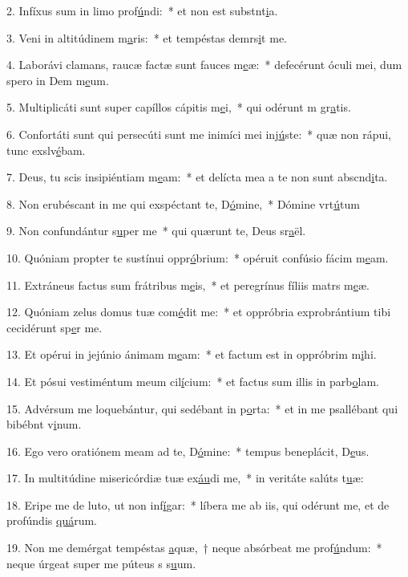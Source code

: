2. Infíxus sum in limo prof\uline{ú}ndi:~* et non est substnt\uline{i}a.\par 
3. Veni in altitúdinem m\uline{a}ris:~* et tempéstas demrs\uline{i}t me.\par 
4. Laborávi clamans, raucæ factæ sunt fauces m\uline{e}æ:~* defecérunt óculi mei, dum spero in Dem m\uline{e}um.\par 
5. Multiplicáti sunt super capíllos cápitis m\uline{e}i,~* qui odérunt m gr\uline{a}tis.\par 
6. Confortáti sunt qui persecúti sunt me inimíci mei inj\uline{ú}ste:~* quæ non rápui, tunc exslv\uline{é}bam.\par 
7. Deus, tu scis insipiéntiam m\uline{e}am:~* et delícta mea a te non sunt abscnd\uline{i}ta.\par 
8. Non erubéscant in me qui exspéctant te, D\uline{ó}mine,~* Dómine vrt\uline{ú}tum\par 
9. Non confundántur s\uline{u}per me~* qui quærunt te, Deus sr\uline{a}ël.\par 
10. Quóniam propter te sustínui oppr\uline{ó}brium:~* opéruit confúsio fácim m\uline{e}am.\par 
11. Extráneus factus sum frátribus m\uline{e}is,~* et peregrínus fíliis matrs m\uline{e}æ.\par 
12. Quóniam zelus domus tuæ com\uline{é}dit me:~* et oppróbria exprobrántium tibi cecidérunt sp\uline{e}r me.\par 
13. Et opérui in jejúnio ánimam m\uline{e}am:~* et factum est in oppróbrim m\uline{i}hi.\par 
14. Et pósui vestiméntum meum cil\uline{í}cium:~* et factus sum illis in parb\uline{o}lam.\par 
15. Advérsum me loquebántur, qui sedébant in p\uline{o}rta:~* et in me psallébant qui bibébnt v\uline{i}num.\par 
16. Ego vero oratiónem meam ad te, D\uline{ó}mine:~* tempus beneplácit, D\uline{e}us.\par 
17. In multitúdine misericórdiæ tuæ ex\uline{áu}di me,~* in veritáte salúts t\uline{u}æ:\par 
18. Eripe me de luto, ut non inf\uline{í}gar:~* líbera me ab iis, qui odérunt me, et de profúndis \uline{quá}rum.\par 
19. Non me demérgat tempéstas \uline{a}quæ,~† neque absórbeat me prof\uline{ú}ndum:~* neque úrgeat super me púteus s s\uline{u}um.\par 
